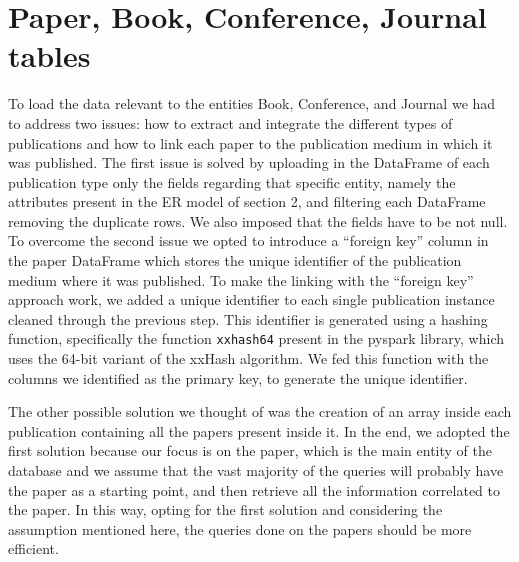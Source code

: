 \section{Paper, Book, Conference, Journal tables}
\label{sec:paper_book_conference_journal_tables}%
To load the data relevant to the entities Book, Conference, and Journal we had to address two issues: how to extract and integrate the different types of publications and how to link each paper to the publication medium in which it was published.
The first issue is solved by uploading in the DataFrame of each publication type only the fields regarding that specific entity, namely the attributes present in the ER model of section 2, and filtering each DataFrame removing the duplicate rows.
We also imposed that the fields have to be not null.
To overcome the second issue we opted to introduce a ``foreign key'' column in the paper DataFrame which stores the unique identifier of the publication medium where it was published.
To make the linking with the ``foreign key'' approach work, we added a unique identifier to each single publication instance cleaned through the previous step.
This identifier is generated using a hashing function, specifically the function \verb|xxhash64| present in the pyspark library, which uses the 64-bit variant of the xxHash algorithm.
We fed this function with the columns we identified as the primary key, to generate the unique identifier.

The other possible solution we thought of was the creation of an array inside each publication containing all the papers present inside it.
In the end, we adopted the first solution because our focus is on the paper, which is the main entity of the database and we assume that the vast majority of the queries will probably have the paper as a starting point, and then retrieve all the information correlated to the paper.
In this way, opting for the first solution and considering the assumption mentioned here, the queries done on the papers should be more efficient.

